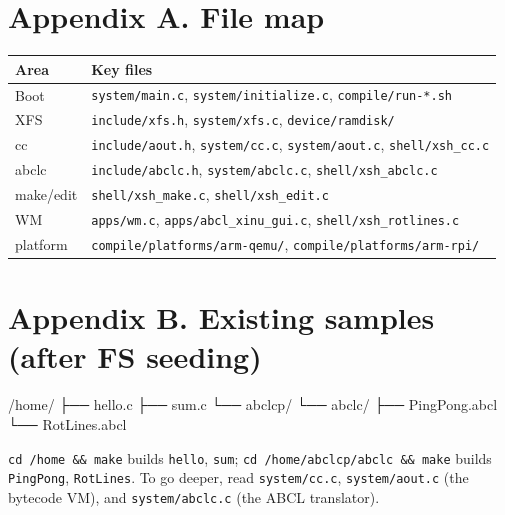 \documentclass[a4paper,11pt]{article}
\begin{document}
\section*{Appendix A. File map}
\begin{center}\footnotesize
\begin{tabular}{@{}l p{9.2cm}@{}}
\toprule \textbf{Area} & \textbf{Key files}\\ \midrule
Boot & \verb|system/main.c|, \verb|system/initialize.c|, \verb|compile/run-*.sh|\\
XFS  & \verb|include/xfs.h|, \verb|system/xfs.c|, \verb|device/ramdisk/|\\
cc   & \verb|include/aout.h|, \verb|system/cc.c|, \verb|system/aout.c|, \verb|shell/xsh_cc.c|\\
abclc& \verb|include/abclc.h|, \verb|system/abclc.c|, \verb|shell/xsh_abclc.c|\\
make/edit & \verb|shell/xsh_make.c|, \verb|shell/xsh_edit.c|\\
WM   & \verb|apps/wm.c|, \verb|apps/abcl_xinu_gui.c|, \verb|shell/xsh_rotlines.c|\\
platform & \verb|compile/platforms/arm-qemu/|, \verb|compile/platforms/arm-rpi/|\\
\bottomrule
\end{tabular}
\end{center}

\section*{Appendix B. Existing samples (after FS seeding)}
\begin{code}
/home/
├── hello.c
├── sum.c
└── abclcp/
    └── abclc/
        ├── PingPong.abcl
        └── RotLines.abcl
\end{code}
\verb|cd /home && make| builds \verb|hello|, \verb|sum|;
\verb|cd /home/abclcp/abclc && make| builds \verb|PingPong|, \verb|RotLines|.
To go deeper, read \verb|system/cc.c|, \verb|system/aout.c| (the bytecode VM),
and \verb|system/abclc.c| (the ABCL translator).
\end{document}
